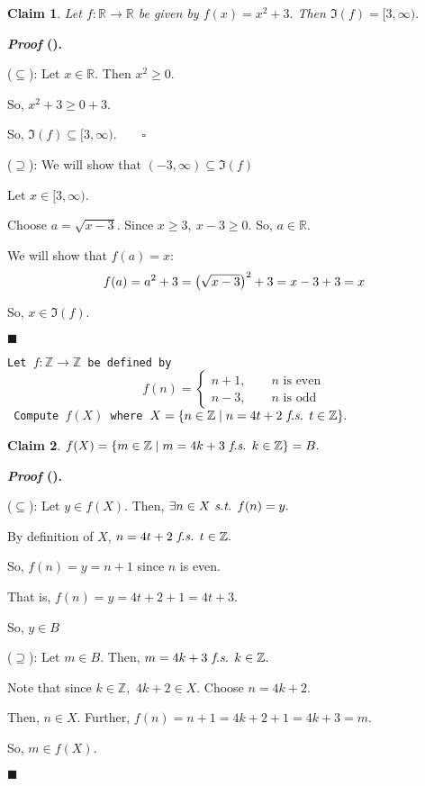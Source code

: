 \documentclass[12pt,a4paper]{article}
\newtheorem{clm}{Claim}[subsection]
\newcounter{nprf}[subsection]
\newenvironment*{prf}{\par\indent\textbf{\textit{Proof} (\stepcounter{nprf}\thenprf). }\par }{\par\hfill $\blacksquare$\par}
\def\Z{{\mathbb{Z}}}
\def\R{{\mathbb{R}}}
\def\st{\emph{ s.t. }}
\def\fs{\emph{ f.s. }}
\begin{document}
\begin{framed}
\begin{clm}Let $f:\R\to\R$ be given by $f(x)=x^2+3.$ Then $\Im(f)=[3,\infty).$\end{clm}
\begin{prf}
	($\subseteq$): Let $x\in\R.$ Then $x^2\geq0.$\par\hspace{5mm} So, $x^2+3\geq0+3.$\par\hspace{5mm} So, $\Im(f)\subseteq[3,\infty).\qquad\square$ \par 
	($\supseteq$): We will show that $(-3,\infty)\subseteq\Im(f)$\par\hspace{5mm} Let $x\in[3,\infty).\qquad$\big[WTS: $x\in\Im(f).$ That is, $\exists a\in\R\st f(a)=x.$\big]\par\hspace{5mm} Choose $a=\sqrt{x-3}.$ Since $x\geq3,\ x-3\geq0.$ So, $a\in\R.$\par\hspace{5mm} We will show that $f(a)=x$: \[f(a)=a^2+3=\qty(\sqrt{x-3})^2+3=x-3+3=x\]\par\hspace{5mm} So, $x\in\Im(f).$
\end{prf}
\end{framed}
\begin{framed}
\noindent\texttt{Let $f:\Z\to\Z$ be defined by \[f(n)=\begin{cases}n+1,\qquad n\text{ is even}\\n-3,\qquad n\text{ is odd}\end{cases}\] Compute $f(X)$ where $X=\qty{n\in\Z\mid n=4t+2\fs t\in\Z}.$}
\begin{clm}$f(X)=\qty{m\in\Z\mid m=4k+3\fs k\in\Z}=B.$\end{clm}
\begin{prf}
	($\subseteq$): Let $y\in f(X)$. Then, $\exists n\in X\st f(n)=y.$\par\hspace{5mm} By definition of $X$, $n=4t+2\fs t\in\Z.$\par\hspace{5mm} So, $f(n)=y=n+1$ since $n$ is even.\par\hspace{5mm} That is, $f(n)=y=4t+2+1=4t+3.$\par\hspace{5mm} So, $y\in B$\par 
	($\supseteq$): Let $m\in B.$ Then, $m=4k+3\fs k\in\Z.\qquad$\par\hspace{5mm} Note that since $k\in\Z,$ $4k+2\in X.$ Choose $n=4k+2.$\par\hspace{5mm} Then, $n\in X.$ Further, $f(n)=n+1=4k+2+1=4k+3=m.$\par\hspace{5mm} So, $m\in f(X).$
\end{prf}
\end{framed}
\end{document}
